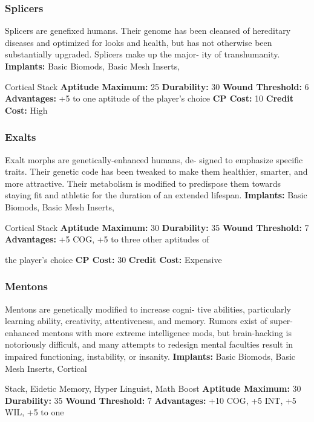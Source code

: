 \subsubsection{Splicers}

Splicers are genefixed humans. Their genome has 
been cleansed of hereditary diseases and optimized 
for looks and health, but has not otherwise been 
substantially upgraded. Splicers make up the major-
ity of transhumanity.
\textbf{Implants: }Basic Biomods, Basic Mesh Inserts, 

Cortical Stack
\textbf{Aptitude Maximum: }25
\textbf{Durability: }30
\textbf{Wound Threshold: }6
\textbf{Advantages: }+5 to one aptitude of the player's choice
\textbf{CP Cost:} 10
\textbf{Credit Cost: }High

\subsubsection{Exalts}

Exalt morphs are genetically-enhanced humans, de-
signed to emphasize specific traits. Their genetic code 
has been tweaked to make them healthier, smarter, 
and more attractive. Their metabolism is modified to 
predispose them towards staying fit and athletic for 
the duration of an extended lifespan.
\textbf{Implants: }Basic Biomods, Basic Mesh Inserts, 

Cortical Stack
\textbf{Aptitude Maximum: }30
\textbf{Durability: }35
\textbf{Wound Threshold: }7
\textbf{Advantages:} +5 COG, +5 to three other aptitudes of 

the player's choice
\textbf{CP Cost: }30
\textbf{Credit Cost: }Expensive

\subsubsection{Mentons}

Mentons are genetically modified to increase cogni-
tive abilities, particularly learning ability, creativity, 
attentiveness, and memory. Rumors exist of super-
enhanced mentons with more extreme intelligence 
mods, but brain-hacking is notoriously difficult, and 
many attempts to redesign mental faculties result in 
impaired functioning, instability, or insanity.
\textbf{Implants: }Basic Biomods, Basic Mesh Inserts, Cortical 

Stack, Eidetic Memory, Hyper Linguist, Math Boost
\textbf{Aptitude Maximum: }30
\textbf{Durability: }35
\textbf{Wound Threshold: }7
\textbf{Advantages:} +10 COG, +5 INT, +5 WIL, +5 to one 


